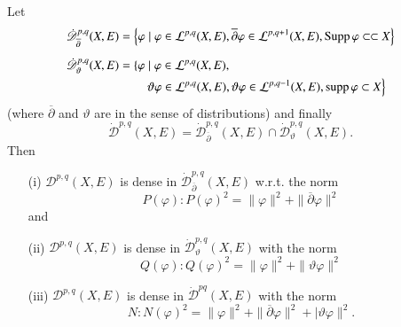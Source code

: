 \begin{alphlemma}\label{chap1:alphlemmaC}%
Let  
$$
\begin{aligned}
  \dot{\mathscr{D}}^{p,q}_{\overline{\partial}} (X ,E) & = \left\{ \varphi
  \mid \varphi \in \mathcal{L}^{p,q} (X, E), \overline{\partial} \varphi
  \in \mathcal{L}^{p,q+1} (X, E), \operatorname{Supp} \varphi \subset \subset X\right \}\\[5pt]
   \dot{\mathscr{D}}^{p,q}_{\vartheta} (X ,E) & = \left\{ \varphi \mid \varphi
  \in \mathcal{L}^{p,q} (X, E),\right.\\
 &\qquad\left.\vartheta \varphi \in \mathcal{L}^{p,q}
  (X, E), \vartheta \varphi \in \mathcal{L}^{p,q-1} (X, E), 
  \operatorname{supp} \varphi \subset  X\right\} 
\end{aligned}
$$
(where $\overline{\partial}$ and $ \vartheta$ are in the sense of
distributions) and finally 
$$
\dot{\mathscr{D}}^{p,q}(X, E)
  = \dot{\mathscr{D}}^{p,q}_{\overline{\partial}} (X ,E) \cap
  \dot{\mathscr{D}}^{p,q}_\vartheta (X, E).
$$
Then
\begin{enumerate}
\item[{\rm (i)}] $\mathscr{D}^{p,q} (X, E)$ is dense in
  $\dot{\mathscr{D}}^{p,q}_{\overline{\partial}} (X ,E)$ w.r.t. the norm
$$
P(\varphi): P(\varphi)^2 = \| \varphi \|^2 + \| \overline{\partial}
\varphi \|^2
$$
and

\item[{\rm (ii)}] $\mathscr{D}^{p,q} (X, E)$ is dense in
  $\dot{\mathscr{D}}^{p,q}_{\vartheta} (X ,E)$  with the norm 
$$
Q(\varphi): Q(\varphi)^2 = \| \varphi \|^2 + \| \vartheta \varphi \|^2 
$$

\item[{\rm (iii)}] $\mathscr{D}^{p,q} (X, E)$ is dense in
  $\dot{\mathscr{D}}^{pq}(X ,E)$ with the norm 
$$
N: N(\varphi)^2 = \| \varphi \|^2 + \| \overline{\partial} \varphi 
\|^2 + | \vartheta \varphi \|^2.
$$ 
\end{enumerate}
\end{alphlemma}

